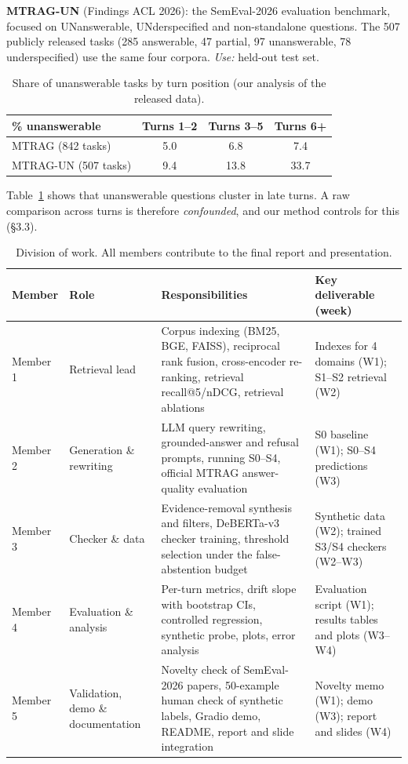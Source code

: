 \documentclass[10pt,twocolumn]{article}
\begin{document}
\textbf{MTRAG-UN} \cite{mtragun} (Findings ACL 2026): the SemEval-2026 evaluation benchmark, focused on UNanswerable, UNderspecified and non-standalone questions. The 507 publicly released tasks (285 answerable, 47 partial, 97 unanswerable, 78 underspecified) use the same four corpora. \emph{Use:} held-out test set.

\begin{table}[H]
\centering\small
\begin{tabular}{@{}lccc@{}}
\toprule
\% unanswerable & Turns 1--2 & Turns 3--5 & Turns 6+ \\
\midrule
MTRAG (842 tasks) & 5.0 & 6.8 & 7.4 \\
MTRAG-UN (507 tasks) & 9.4 & 13.8 & 33.7 \\
\bottomrule
\end{tabular}
\caption{\small Share of unanswerable tasks by turn position (our analysis of the released data).}
\label{tab:data}
\end{table}
\vspace{-10pt}
Table~\ref{tab:data} shows that unanswerable questions cluster in late turns. A raw comparison across turns is therefore \emph{confounded}, and our method controls for this (\S3.3).

\begin{table}[t]
\centering\footnotesize
\begin{tabularx}{\textwidth}{@{}p{1.25cm}p{2.3cm}Yp{4.1cm}@{}}
\toprule
\textbf{Member} & \textbf{Role} & \textbf{Responsibilities} & \textbf{Key deliverable (week)} \\
\midrule
Member 1 & Retrieval lead & Corpus indexing (BM25, BGE, FAISS), reciprocal rank fusion, cross-encoder re-ranking, retrieval recall@5/nDCG, retrieval ablations & Indexes for 4 domains (W1); S1--S2 retrieval (W2) \\
Member 2 & Generation \& rewriting & LLM query rewriting, grounded-answer and refusal prompts, running S0--S4, official MTRAG answer-quality evaluation & S0 baseline (W1); S0--S4 predictions (W3) \\
Member 3 & Checker \& data & Evidence-removal synthesis and filters, DeBERTa-v3 checker training, threshold selection under the false-abstention budget & Synthetic data (W2); trained S3/S4 checkers (W2--W3) \\
Member 4 & Evaluation \& analysis & Per-turn metrics, drift slope with bootstrap CIs, controlled regression, synthetic probe, plots, error analysis & Evaluation script (W1); results tables and plots (W3--W4) \\
Member 5 & Validation, demo \& documentation & Novelty check of SemEval-2026 papers, 50-example human check of synthetic labels, Gradio demo, README, report and slide integration & Novelty memo (W1); demo (W3); report and slides (W4) \\
\bottomrule
\end{tabularx}
\caption{\small Division of work. All members contribute to the final report and presentation.}
\label{tab:work}
\end{table}
\end{document}
